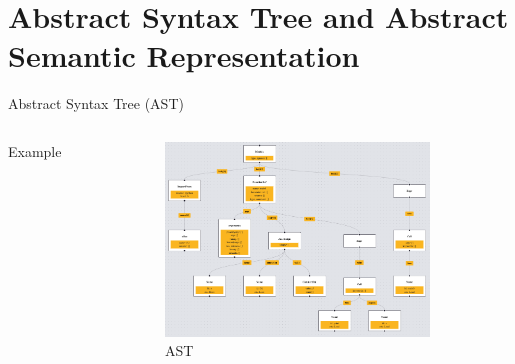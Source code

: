 \section{Abstract Syntax Tree and Abstract Semantic Representation}

\begin{frame}{Abstract Syntax Tree (AST)}
    \begin{columns}
        \begin{column}{0.5\textwidth}
            
            \centering Example
        \end{column}
        \begin{column}{0.5\textwidth}
            \begin{figure}
                \centering
                \includegraphics[width=7cm]{images/ast.png}
                \caption{AST}
            \end{figure}
        \end{column}
    \end{columns}
\end{frame}

